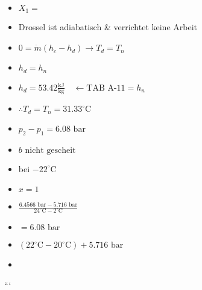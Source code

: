 \begin{itemize}
    \item $X_1 =$
    \item Drossel ist adiabatisch \& verrichtet keine Arbeit
    \item $0 = \dot{m} (h_c - h_d) \rightarrow T_d = T_n$
    \item $h_d = h_n$
    \item $h_d = 53.42 \frac{\text{kJ}}{\text{kg}} \quad \leftarrow \text{TAB A-11} = h_n$
    \item $\therefore T_d = T_n = 31.33^\circ \text{C}$
    \item $p_2 - p_1 = 6.08 \text{ bar}$
    \item $b \text{ nicht gescheit}$
    \item bei $-22^\circ \text{C}$
    \item $x = 1$
    \item $\frac{6.4566 \text{ bar} - 5.716 \text{ bar}}{24^\circ \text{C} - 2^\circ \text{C}}$
    \item $= 6.08 \text{ bar}$
    \item $(22^\circ \text{C} - 20^\circ \text{C}) + 5.716 \text{ bar}$
    \item {}
\end{itemize}

```